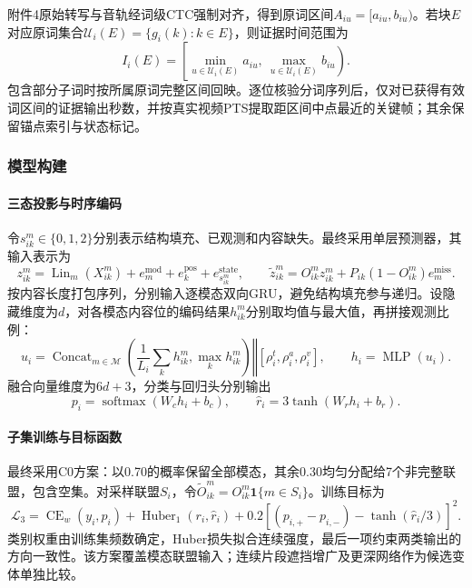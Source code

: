 附件4原始转写与音轨经词级CTC强制对齐，得到原词区间$A_{iu}=[a_{iu},b_{iu})$。若块$E$对应原词集合$\mathcal U_i(E)=\{g_i(k):k\in E\}$，则证据时间范围为
\begin{equation}
I_i(E)=\left[\min_{u\in\mathcal U_i(E)}a_{iu},\ \max_{u\in\mathcal U_i(E)}b_{iu}\right).
\end{equation}
包含部分子词时按所属原词完整区间回映。逐位核验分词序列后，仅对已获得有效词区间的证据输出秒数，并按真实视频PTS提取距区间中点最近的关键帧；其余保留锚点索引与状态标记。

\subsubsection{模型构建}
\paragraph{三态投影与时序编码}
令$s^m_{ik}\in\{0,1,2\}$分别表示结构填充、已观测和内容缺失。最终采用单层预测器，其输入表示为
\begin{equation}
z^m_{ik}=\operatorname{Lin}_m(X^m_{ik})+e_m^{\mathrm{mod}}+e_k^{\mathrm{pos}}+e^{\mathrm{state}}_{s^m_{ik}},\qquad
\widetilde z^m_{ik}=O^m_{ik}z^m_{ik}+P_{ik}(1-O^m_{ik})e_m^{\mathrm{miss}}.
\end{equation}
按内容长度打包序列，分别输入逐模态双向GRU，避免结构填充参与递归。设隐藏维度为$d$，对各模态内容位的编码结果$h^m_{ik}$分别取均值与最大值，再拼接观测比例：
\begin{equation}
u_i=\operatorname{Concat}_{m\in\mathcal M}\left(\frac1{L_i}\sum_kh^m_{ik},\max_kh^m_{ik}\right)
\mathbin\Vert[\rho_i^t,\rho_i^a,\rho_i^v],\qquad h_i=\operatorname{MLP}(u_i).
\end{equation}
融合向量维度为$6d+3$，分类与回归头分别输出
\begin{equation}
p_i=\operatorname{softmax}(W_ch_i+b_c),\qquad \widehat r_i=3\tanh(W_rh_i+b_r).
\end{equation}

\paragraph{子集训练与目标函数}
最终采用C0方案：以0.70的概率保留全部模态，其余0.30均匀分配给7个非完整联盟，包含空集。对采样联盟$S_i$，令$\widetilde O^m_{ik}=O^m_{ik}\mathbf1\{m\in S_i\}$。训练目标为
\begin{equation}
\mathcal L_3=\operatorname{CE}_w(y_i,p_i)+\operatorname{Huber}_1(r_i,\widehat r_i)
+0.2\left[(p_{i,+}-p_{i,-})-\tanh(\widehat r_i/3)\right]^2.
\end{equation}
类别权重由训练集频数确定，Huber损失拟合连续强度，最后一项约束两类输出的方向一致性。该方案覆盖模态联盟输入；连续片段遮挡增广及更深网络作为候选变体单独比较。

